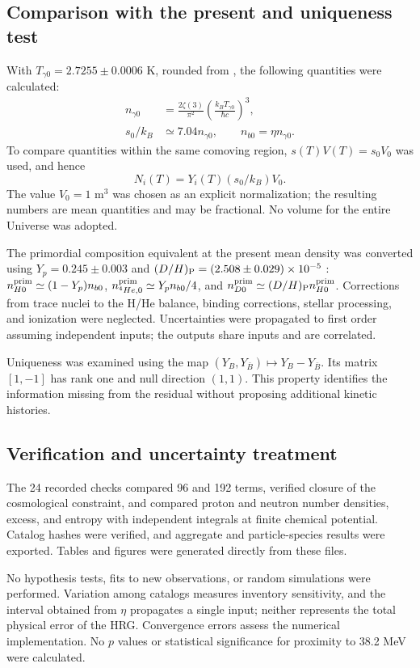 \subsection{Comparison with the present and uniqueness test}
With $T_{\gamma0}=2.7255\pm0.0006$ K, rounded from \citet{Fixsen2009}, the following quantities were calculated:
\begin{align}
n_{\gamma0}&=\frac{2\zeta(3)}{\pi^2}
\left(\frac{k_BT_{\gamma0}}{\hbar c}\right)^3,\nonumber\\
s_0/k_B&\simeq7.04n_{\gamma0},\qquad
n_{b0}=\eta n_{\gamma0}.\label{eq:present}
\end{align}
To compare quantities within the same comoving region, $s(T)V(T)=s_0V_0$ was used, and hence
\begin{equation}
N_i(T)=Y_i(T)(s_0/k_B)V_0.\label{eq:comoving}
\end{equation}
The value $V_0=1$ m$^3$ was chosen as an explicit normalization; the resulting numbers are mean quantities and may be fractional. No volume for the entire Universe was adopted.

The primordial composition equivalent at the present mean density was converted using $Y_p=0.245\pm0.003$ and $(D/H)_{\rm P}=(2.508\pm0.029)\times10^{-5}$ \citep{Fields2025}: $n_{H0}^{\rm prim}\simeq(1-Y_p)n_{b0}$, $n_{{}^4He,0}^{\rm prim}\simeq Y_p n_{b0}/4$, and $n_{D0}^{\rm prim}\simeq(D/H)_{\rm P}n_{H0}^{\rm prim}$. Corrections from trace nuclei to the H/He balance, binding corrections, stellar processing, and ionization were neglected. Uncertainties were propagated to first order assuming independent inputs; the outputs share inputs and are correlated.

Uniqueness was examined using the map $(Y_B,Y_{\bar B})\mapsto Y_B-Y_{\bar B}$. Its matrix $[1,-1]$ has rank one and null direction $(1,1)$. This property identifies the information missing from the residual without proposing additional kinetic histories.

\subsection{Verification and uncertainty treatment}
The 24 recorded checks compared 96 and 192 terms, verified closure of the cosmological constraint, and compared proton and neutron number densities, excess, and entropy with independent integrals at finite chemical potential. Catalog hashes were verified, and aggregate and particle-species results were exported. Tables and figures were generated directly from these files.

No hypothesis tests, fits to new observations, or random simulations were performed. Variation among catalogs measures inventory sensitivity, and the interval obtained from $\eta$ propagates a single input; neither represents the total physical error of the HRG. Convergence errors assess the numerical implementation. No $p$ values or statistical significance for proximity to 38.2 MeV were calculated.
